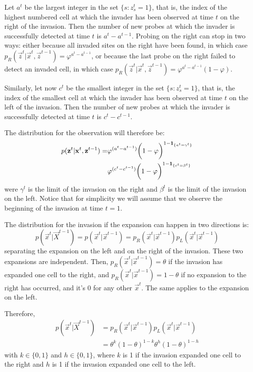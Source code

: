 Let $a^{t}$ be the largest integer in the set $\{ s : z_s^{t} = 1 \}$, that is, the index of the highest numbered cell at which the invader has been observed at time $t$ on the right of the invasion. Then the number of new probes at which the invader is successfully detected at time $t$ is $a^{t} - a^{t-1}$. Probing on the right can stop in two ways: either because all invaded sites on the right have been found, in which case $p_R(\vec{z}^{t} | \vec{x}^{t}, \vec{z}^{t-1}) = \varphi^{a^{t} - a^{t-1}}$, or because the last probe on the right failed to detect an invaded cell, in which case $p_R(\vec{z}^{t} | \vec{x}^{t}, \vec{z}^{t-1}) = \varphi^{a^{t} - a^{t-1}} (1 - \varphi)$.

Similarly, let now $c^{t}$ be the smallest integer in the set $\{ s : z_s^{t} = 1 \}$, that is, the index of the smallest cell at which the invader has been observed at time $t$ on the left of the invasion. Then the number of new probes at which the invader is successfully detected at time $t$ is $c^{t} - c^{t-1}$.

The distribution for the observation will therefore be:
\begin{align*}
    p(\mathbf{z}^{t} | \mathbf{x}^{t}, \mathbf{z}^{t-1}) = &\varphi^{(a^{t} - a^{t-1})} \bigg(1 - \varphi \bigg)^{1-\mathbf{1}_{\{a^{t}=\gamma^{t}\}}}\\
    &\varphi^{(c^{t} - c^{t-1})} \bigg( 1 - \varphi \bigg)^{1-\mathbf{1}_{\{c^{t}=\beta^{t}\}}}
\end{align*}
were $\gamma^{t}$ is the limit of the invasion on the right and $\beta^{t}$ is the limit of the invasion on the left. Notice that for simplicity we will assume that we observe the beginning of the invasion at time $t=1$. 

The distribution for the invasion if the expansion can happen in two directions is:
\begin{equation*}
    p(\vec{x}^{t} | \vec{X}^{t-1}) = p(\vec{x}^{t} | \vec{x}^{t-1}) = p_R(\vec{x}^{t} | \vec{x}^{t-1}) p_L(\vec{x}^{t} | \vec{x}^{t-1}) 
\end{equation*}
separating the expansion on the left and on the right of the invasion.
These two expansions are independent. Then, $p_R(\vec{x}^{t} | \vec{x}^{t-1}) = \theta$ if the invasion has expanded one cell to the right, and $p_R(\vec{x}^{t} | \vec{x}^{t-1}) = 1 - \theta$ if no expansion to the right has occurred, and it's 0 for any other $\vec{x}^{t}$. The same applies to the expansion on the left.

Therefore,
\begin{align*}
    p(\vec{x}^{t} | \vec{X}^{t-1}) &= p_R(\vec{x}^{t} | \vec{x}^{t-1}) p_L(\vec{x}^{t} | \vec{x}^{t-1})\\
    & = \theta^{k} (1-\theta)^{1-k}\theta^{h} (1-\theta)^{1-h} 
\end{align*}
with $k \in \{0,1\}$ and $h \in \{0,1\}$, {\color{blue} where $k$ is 1 if the invasion expanded one cell to the right and $h$ is 1 if the invasion expanded one cell to the left.}


